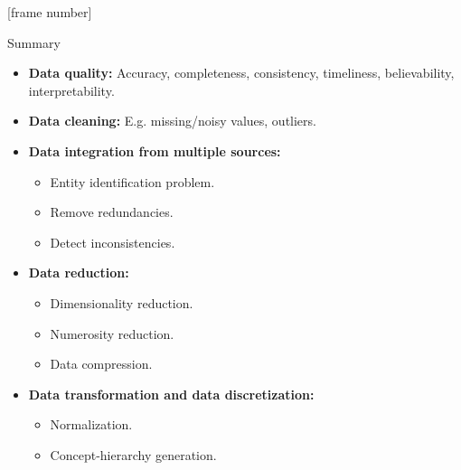 \documentclass[aspectratio=169,t]{beamer}
\begin{document}
  {
    [frame number]
    \begin{frame}{Summary}
      \begin{itemize}
        \item \textbf{Data quality:} Accuracy, completeness, consistency, timeliness, believability, interpretability.
        \item \textbf{Data cleaning:} E.g. missing/noisy values, outliers.
        \item \textbf{Data integration from multiple sources:}
        \begin{itemize}
          \item Entity identification problem.
          \item Remove redundancies.
          \item Detect inconsistencies.
        \end{itemize}
        \item \textbf{Data reduction:}
        \begin{itemize}
          \item Dimensionality reduction.
          \item Numerosity reduction.
          \item Data compression.
        \end{itemize}
        \item \textbf{Data transformation and data discretization:}
        \begin{itemize}
          \item Normalization.
          \item Concept-hierarchy generation.
        \end{itemize}
      \end{itemize}
    \end{frame}
  }
\end{document}
